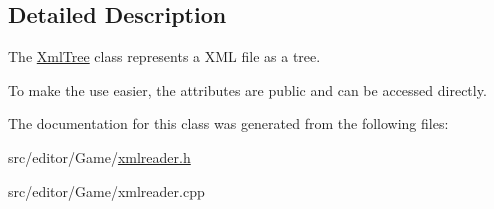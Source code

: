 \subsection{\-Detailed \-Description}
\-The \hyperlink{class_xml_tree}{\-Xml\-Tree} class represents a \-X\-M\-L file as a tree. 

\-To make the use easier, the attributes are public and can be accessed directly. 

\-The documentation for this class was generated from the following files\-:\begin{DoxyCompactItemize}
\item 
src/editor/\-Game/\hyperlink{xmlreader_8h}{xmlreader.\-h}\item 
src/editor/\-Game/xmlreader.\-cpp\end{DoxyCompactItemize}
